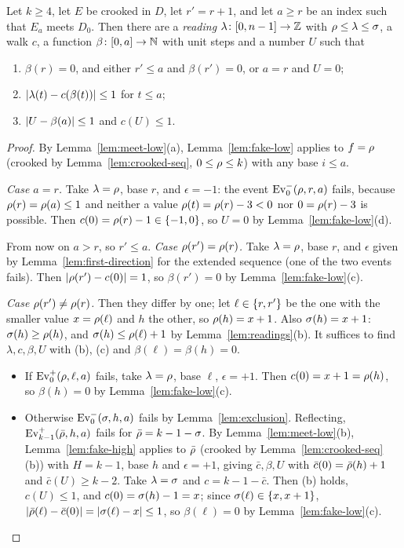 
\begin{proposition}\label{prop:prefix-fold}
Let $k\ge4$, let $E$ be crooked in $D$, let $r'=r+1$, and let $a\ge r$ be an index such that $E_a$ meets $D_0$. Then there are a
\emph{reading} $\lambda\colon[0,n-1]\to\mathbb{Z}$ with $\rho\le\lambda\le\sigma$, a walk $c$, a function $\beta\colon[0,a]\to\mathbb{N}$ with unit steps
and a number $U$ such that
\begin{enumerate}[label=(\alph*)]
\item $\beta(r)=0$, and either $r'\le a$ and $\beta(r')=0$, or $a=r$ and $U=0$;
\item $\left\lvert \lambda(t)-c(\beta(t))\right\rvert\le1$ for $t\le a$;
\item $\left\lvert U-\beta(a)\right\rvert\le1$ and $c(U)\le1$.
\end{enumerate}
\end{proposition}

\begin{proof}
By Lemma~\ref{lem:meet-low}(a), Lemma~\ref{lem:fake-low} applies to $f=\rho$ (crooked by Lemma~\ref{lem:crooked-seq}, $0\le\rho\le k$)
with any base $i\le a$.

\emph{Case $a=r$.} Take $\lambda=\rho$, base $r$, and $\epsilon=-1$: the event $\mathrm{Ev}^-_0(\rho,r,a)$ fails, because $\rho(r)=\rho(a)\le1$
and neither a value $\rho(t)=\rho(r)-3<0$ nor $0=\rho(r)-3$ is possible. Then $c(0)=\rho(r)-1\in\left\{ -1,0 \right\}$, so $U=0$ by
Lemma~\ref{lem:fake-low}(d).

From now on $a>r$, so $r'\le a$. \emph{Case $\rho(r')=\rho(r)$.} Take $\lambda=\rho$, base $r$, and $\epsilon$ given by
Lemma~\ref{lem:first-direction} for the extended sequence (one of the two events fails). Then $\left\lvert \rho(r')-c(0)\right\rvert=1$, so $\beta(r')=0$ by
Lemma~\ref{lem:fake-low}(c).

\emph{Case $\rho(r')\ne\rho(r)$.} Then they differ by one; let $\ell\in\left\{ r,r' \right\}$ be the one with the smaller value $x=\rho(\ell)$ and $h$
the other, so $\rho(h)=x+1$. Also $\sigma(h)=x+1$: $\sigma(h)\ge\rho(h)$, and $\sigma(h)\le\rho(\ell)+1$ by Lemma~\ref{lem:readings}(b). It suffices
to find $\lambda,c,\beta,U$ with (b), (c) and $\beta(\ell)=\beta(h)=0$.
\begin{itemize}
\item If $\mathrm{Ev}^+_0(\rho,\ell,a)$ fails, take $\lambda=\rho$, base $\ell$, $\epsilon=+1$. Then $c(0)=x+1=\rho(h)$, so $\beta(h)=0$ by
Lemma~\ref{lem:fake-low}(c).
\item Otherwise $\mathrm{Ev}^-_0(\sigma,h,a)$ fails by Lemma~\ref{lem:exclusion}. Reflecting, $\mathrm{Ev}^+_{k-1}(\bar{\rho},h,a)$ fails for
$\bar{\rho}=k-1-\sigma$. By Lemma~\ref{lem:meet-low}(b), Lemma~\ref{lem:fake-high} applies to $\bar{\rho}$ (crooked by
Lemma~\ref{lem:crooked-seq}(b)) with $H=k-1$, base $h$ and $\epsilon=+1$, giving $\bar c,\beta,U$ with $\bar c(0)=\bar{\rho}(h)+1$ and
$\bar c(U)\ge k-2$. Take $\lambda=\sigma$ and $c=k-1-\bar c$. Then (b) holds, $c(U)\le1$, and $c(0)=\sigma(h)-1=x$; since
$\sigma(\ell)\in\left\{ x,x+1 \right\}$, $\left\lvert \bar{\rho}(\ell)-\bar c(0)\right\rvert=\left\lvert \sigma(\ell)-x\right\rvert\le1$, so $\beta(\ell)=0$ by Lemma~\ref{lem:fake-low}(c).\qedhere
\end{itemize}
\end{proof}

